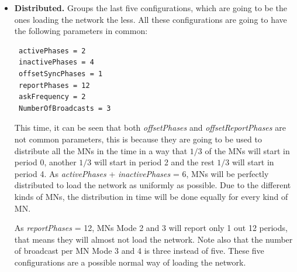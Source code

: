 \begin{itemize}
From this group, and attending to the number of \acp{MN} of each Mode (see Figure \ref{fig:ProtocolPhases}) these 5 configurations are proposed:
\begin{itemize}
 \item[-] \textbf{Config 1}: 15 \acp{MN} Mode 1, 15 \acp{MN} Mode 2, 15 \acp{MN} Mode 3 and 15 \acp{MN} Mode 4.
 \item[-] \textbf{Config 2}: 6 \acp{MN} Mode 1, 6 \acp{MN} Mode 2, 15 \acp{MN} Mode 3 and 33 \acp{MN} Mode 4.
 \item[-] \textbf{Config 3}: 6 \acp{MN} Mode 1, 6 \acp{MN} Mode 2, 33 \acp{MN} Mode 3 and 15 \acp{MN} Mode 4.
 \item[-] \textbf{Config 4}: 33 \acp{MN} Mode 1, 15 \acp{MN} Mode 2, 6 \acp{MN} Mode 3 and 6 \acp{MN} Mode 4.
 \item[-] \textbf{Config 5}: 15 \acp{MN} Mode 1, 33 \acp{MN} Mode 2, 6 \acp{MN} Mode 3 and 6 \acp{MN} Mode 4.
\end{itemize}
 \item \textbf{Distributed. }Groups the last five configurations, which are going to be the ones loading the network the less. All these
configurations are going to have the following parameters in common:
\begin{verbatim}
 activePhases = 2
 inactivePhases = 4
 offsetSyncPhases = 1
 reportPhases = 12
 askFrequency = 2
 NumberOfBroadcasts = 3
\end{verbatim}
This time, it can be seen that both \textit{offsetPhases} and \textit{offsetReportPhases} are not common parameters, this is because they are going to be
used to distribute all the \acp{MN} in the time in a way that $1/3$ of the \acp{MN} will start in period 0, another $1/3$ will start in period 2 and the 
rest $1/3$ will start in period 4. As \textit{activePhases} + \textit{inactivePhases} = 6, \acp{MN} will be perfectly distributed to load the network as 
uniformly as possible. Due to the different kinds of \acp{MN}, the distribution in time will be done equally for every kind of \ac{MN}.

As \textit{reportPhases} = 12, \acp{MN} Mode 2 and 3 will report only 1 out 12 periods, that means they will almost not load the network. Note also that 
the number of broadcast per \ac{MN} Mode 3 and 4 is three instead of five. These five configurations are a possible normal way of loading the network.


\end{itemize}
